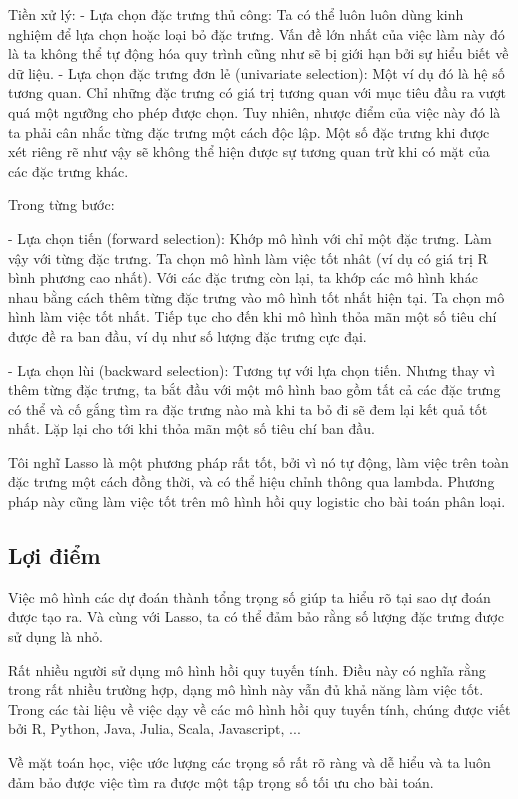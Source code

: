 Tiền xử lý:
- Lựa chọn đặc trưng thủ công: Ta có thể luôn luôn dùng kinh nghiệm để lựa chọn hoặc loại bỏ đặc trưng. Vấn đề lớn nhất của việc làm này đó là ta không thể tự động hóa quy trình cũng như sẽ bị giới hạn bởi sự hiểu biết về dữ liệu.
- Lựa chọn đặc trưng đơn lẻ (univariate selection): Một ví dụ đó là hệ số tương quan. Chỉ những đặc trưng có giá trị tương quan với mục tiêu đầu ra vượt quá một ngưỡng cho phép được chọn. Tuy nhiên, nhược điểm của việc này đó là ta phải cân nhắc từng đặc trưng một cách độc lập. Một số đặc trưng khi được xét riêng rẽ như vậy sẽ không thể hiện được sự tương quan trừ khi có mặt của các đặc trưng khác.

Trong từng bước:

- Lựa chọn tiến (forward selection): Khớp mô hình với chỉ một đặc trưng. Làm vậy với từng đặc trưng. Ta chọn mô hình làm việc tốt nhât (ví dụ có giá trị R bình phương cao nhất). Với các đặc trưng còn lại, ta khớp các mô hình khác nhau bằng cách thêm từng đặc trưng vào mô hình tốt nhất hiện tại. Ta chọn mô hình làm việc tốt nhất. Tiếp tục cho đến khi mô hình thỏa mãn một số tiêu chí được đề ra ban đầu, ví dụ như số lượng đặc trưng cực đại.


- Lựa chọn lùi (backward selection): Tương tự với lựa chọn tiến. Nhưng thay vì thêm từng đặc trưng, ta bắt đầu với một mô hình bao gồm tất cả các đặc trưng có thể và cố gắng tìm ra đặc trưng nào mà khi ta bỏ đi sẽ đem lại kết quả tốt nhất. Lặp lại cho tới khi thỏa mãn một số tiêu chí ban đầu.

Tôi nghĩ Lasso là một phương pháp rất tốt, bởi vì nó tự động, làm việc trên toàn đặc trưng một cách đồng thời, và có thể hiệu chỉnh thông qua lambda. Phương pháp này cũng làm việc tốt trên mô hình hồi quy logistic cho bài toán phân loại.

\subsection{Lợi điểm}
Việc mô hình các dự đoán thành tổng trọng số giúp ta hiểu rõ tại sao dự đoán được tạo ra. Và cùng với Lasso, ta có thể đảm bảo rằng số lượng đặc trưng được sử dụng là nhỏ.

Rất nhiều người sử dụng mô hình hồi quy tuyến tính. Điều này có nghĩa rằng trong rất nhiều trường hợp, dạng mô hình này vẫn đủ khả năng làm việc tốt. Trong các  tài liệu về việc dạy về các mô hình hồi quy tuyến tính, chúng được viết bởi R, Python, Java, Julia, Scala, Javascript, ...

Về mặt toán học, việc ước lượng các trọng số rất rõ ràng và dễ hiểu và ta luôn đảm bảo được việc tìm ra được một tập trọng số tối ưu cho bài toán.

